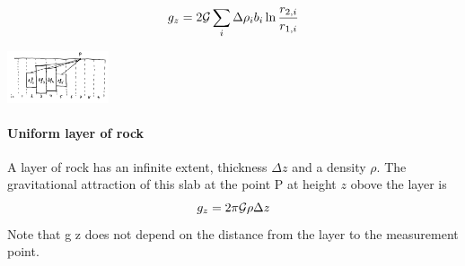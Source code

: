\[
g_z=2 {\cal G} \sum_i  \Delta \rho_i  b_i  \ln \frac{r_{2,i}}{r_{1,i}}
\]

\begin{center}
\includegraphics[width=3cm]{images/gravity/columns}
\end{center}





\paragraph{Uniform layer of rock}

A layer of rock has an infinite extent, thickness $\Delta z$ 
and a density $\rho$. The gravitational
attraction of this slab at the point P at height $z$ obove the layer is 
\[
g_z=2 \pi {\cal G} \rho \Delta z
\]
Note that g z does not depend on the distance from the layer to the measurement point.




